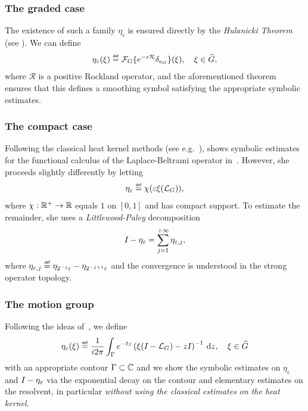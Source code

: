 \subsubsection{The graded case}

The existence of such a family $\eta_\epsilon$ is ensured directly by the \emph{Hulanicki Theorem} (see \cite[Theorem 4.5.1]{FischerRuzhansky16}).
We can define
\begin{align*}
    \eta_\epsilon(\xi) \defeq \Fourier \{\e^{-\epsilon \mathcal R} \delta_{e_\Group}\}(\xi),
    \quad \xi \in \dualGroup \Group,
\end{align*}
where $\mathcal R$ is a positive Rockland operator,
and the aforementioned theorem ensures that this defines a smoothing symbol satisfying the appropriate symbolic estimates.

\subsubsection{The compact case}

Following the classical heat kernel methods (see e.g.~\cite{FurioliMelziVeneruso06,VaropoulosSaloffCosteCoulhon92}),
\citeauthor{Fischer2015} shows symbolic estimates for the functional calculus of the Laplace-Beltrami operator in~\cite{Fischer2015}.
However, she proceeds slightly differently by letting
\begin{align*}
    \eta_\epsilon
    \defeq \chi(\epsilon \xi(\Laplacian [\Group])),
\end{align*}
where $\chi : \mathbb{R}^+ \to \mathbb{R}$ equals $1$ on $[0, 1]$ and has compact support.
To estimate the remainder,
she uses a \emph{Littlewood-Paley} decomposition
\begin{align*}
    {I_{}} - \eta_\varepsilon = \sum_{j = 1}^{+\infty} \eta_{\varepsilon, j},
\end{align*}
where $\eta_{\epsilon, j} \defeq \eta_{2^{-j} \epsilon} - \eta_{2^{-j + 1} \epsilon}$
and the convergence is understood in the strong operator topology.

\subsubsection{The motion group}

Following the ideas of~\cite{Shubin01, RuzhanskyWirth14},
we define
\begin{align*}
    \eta_\epsilon(\xi) \defeq
    \frac 1 {\i \turn} \int_\Gamma \e^{-t z} \left(\xi(\Id {} - \Laplacian) - z \Id {}\right)^{-1} \dd z,
    \quad \xi \in \dualGroup \Group
\end{align*}
with an appropriate contour $\Gamma \subset \mathbb{C}$
and we show the symbolic estimates on $\eta_\epsilon$ and ${I_{}} - \eta_\varepsilon$
via the exponential decay on the contour and elementary estimates on the resolvent,
in particular \emph{without using the classical estimates on the heat kernel}.

